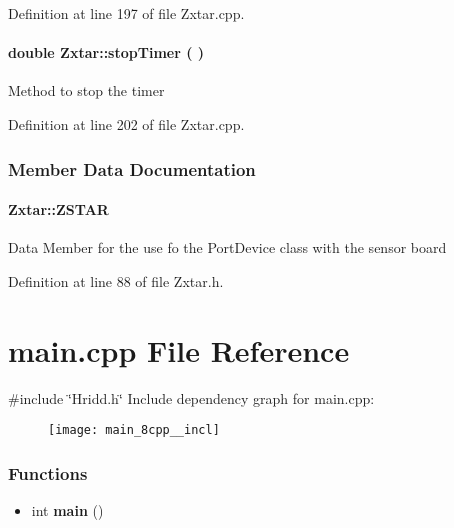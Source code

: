 \begin{appendices}
\-Definition at line 197 of file \-Zxtar.\-cpp.

\paragraph[{stop\-Timer}]{\setlength{\rightskip}{0pt plus 5cm}double {\bf \-Zxtar\-::stop\-Timer} (
)}\label{class_zxtar_ac7e152ff3caa185696bdbdab1e245570}
\-Method to stop the timer 

\-Definition at line 202 of file \-Zxtar.\-cpp.



\subsubsection{\-Member \-Data \-Documentation}
\paragraph[{\-Z\-S\-T\-A\-R}]{ {\bf \-Zxtar\-::\-Z\-S\-T\-A\-R}}\label{class_zxtar_a963d107179ac6801f81b80632bf4e189}
\-Data \-Member for the use fo the \-Port\-Device class with the sensor board 

\-Definition at line 88 of file \-Zxtar.\-h.

    
    
    
  
  
    \section{main.cpp \-File \-Reference}    
{\ttfamily \#include \char`\"{}\-Hridd.\-h\char`\"{}}\*
\-Include dependency graph for main.\-cpp\-:\nopagebreak
\begin{figure}[H]
\begin{center}
\leavevmode
\texttt{[image: main\_8cpp\_\_incl]}
\end{center}
\end{figure}
\subsubsection*{\-Functions}
\begin{itemize}
\item 
int {\bf main} ()
\end{itemize}


\end{appendices}
